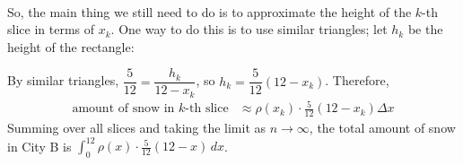 \documentclass{article}
\begin{document}
\begin{enumerate}
\begin{enumerate}
\begin{solution}
\begin{align*}
      \end{align*}
      So, the main thing we still need to do is to approximate the height
      of the $k$-th slice in terms of $x_k$.  One way to do this is to
      use similar triangles; let $h_k$ be the height of the rectangle: 
      \begin{center}
      \end{center}
      By similar triangles, $\dfrac{5}{12} = \dfrac{h_k}{12 - x_k}$, so
      $h_k = \dfrac{5}{12} (12 - x_k)$.
      Therefore,
      \begin{align*}
        \text{amount of snow in $k$-th slice} & \approx \rho(x_k) \cdot
        \frac{5}{12} (12 - x_k) \Delta x
      \end{align*}
      Summing over all slices and taking the limit as $n \to \infty$, the
      total amount of snow in City B is $\boxed{\int_0^{12} \rho(x) \cdot
        \frac{5}{12} (12 - x) \,dx}$.
    \end{solution}

  \end{enumerate}

\end{enumerate}
\end{document}
